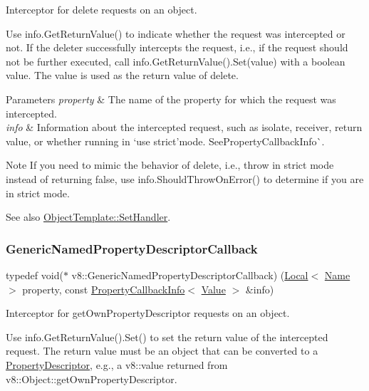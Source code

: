 Interceptor for delete requests on an object.

Use {\ttfamily info.\+Get\+Return\+Value()} to indicate whether the request was intercepted or not. If the deleter successfully intercepts the request, i.\+e., if the request should not be further executed, call {\ttfamily info.\+Get\+Return\+Value().Set(value)} with a boolean {\ttfamily value}. The {\ttfamily value} is used as the return value of {\ttfamily delete}.


\begin{DoxyParams}{Parameters}
{\em property} & The name of the property for which the request was intercepted. \\
\hline
{\em info} & Information about the intercepted request, such as isolate, receiver, return value, or whether running in `\textquotesingle{}use strict'{\ttfamily mode. See}Property\+Callback\+Info\`{}.\\
\hline
\end{DoxyParams}
\begin{DoxyNote}{Note}
If you need to mimic the behavior of {\ttfamily delete}, i.\+e., throw in strict mode instead of returning false, use {\ttfamily info.\+Should\+Throw\+On\+Error()} to determine if you are in strict mode.
\end{DoxyNote}
See also {\ttfamily \mbox{\hyperlink{classv8_1_1ObjectTemplate_a3d5666f1e9b0f46df6b4dbb7cfbb6114}{Object\+Template\+::\+Set\+Handler}}.} \mbox{\label{namespacev8_a8cf8faa26baffa84173a24906c0d49f6}} 
\subsubsection{\texorpdfstring{Generic\+Named\+Property\+Descriptor\+Callback}{GenericNamedPropertyDescriptorCallback}}
{\footnotesize\ttfamily typedef void($\ast$ v8\+::\+Generic\+Named\+Property\+Descriptor\+Callback) (\mbox{\hyperlink{classv8_1_1Local}{Local}}$<$ \mbox{\hyperlink{classv8_1_1Name}{Name}} $>$ property, const \mbox{\hyperlink{classv8_1_1PropertyCallbackInfo}{Property\+Callback\+Info}}$<$ \mbox{\hyperlink{classv8_1_1Value}{Value}} $>$ \&info)}

Interceptor for get\+Own\+Property\+Descriptor requests on an object.

Use {\ttfamily info.\+Get\+Return\+Value().Set()} to set the return value of the intercepted request. The return value must be an object that can be converted to a \mbox{\hyperlink{classv8_1_1PropertyDescriptor}{Property\+Descriptor}}, e.\+g., a {\ttfamily v8\+::value} returned from {\ttfamily v8\+::\+Object\+::get\+Own\+Property\+Descriptor}.


